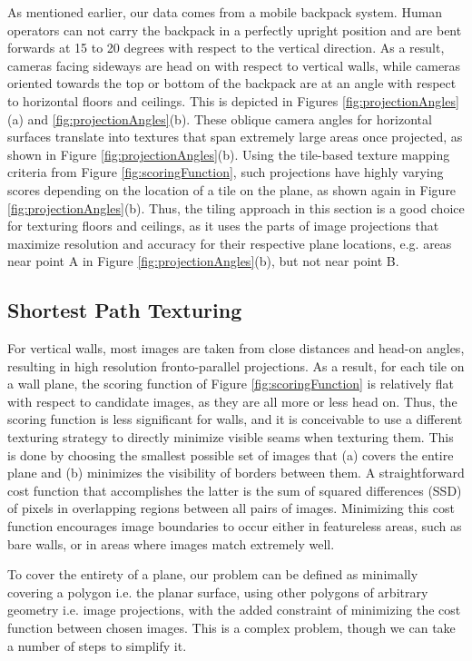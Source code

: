 \documentclass[]{spie}  %
\begin{document}
As mentioned earlier, our data comes from a mobile backpack
system. Human operators can not carry the backpack in a perfectly
upright position and are bent forwards at 15 to 20 degrees with
respect to the vertical direction. As a result, cameras facing
sideways are head on with respect to vertical walls, while cameras
oriented towards the top or bottom of the backpack are at an angle
with respect to horizontal floors and ceilings. This is depicted in
Figures \ref{fig:projectionAngles}(a) and
\ref{fig:projectionAngles}(b). These oblique camera angles for
horizontal surfaces translate into textures that span extremely large
areas once projected, as shown in Figure
\ref{fig:projectionAngles}(b). Using the tile-based texture mapping
criteria from Figure \ref{fig:scoringFunction}, such projections have
highly varying scores depending on the location of a tile on the
plane, as shown again in Figure \ref{fig:projectionAngles}(b). Thus,
the tiling approach in this section is a
good choice for texturing floors and ceilings, as it uses the parts of
image projections that maximize resolution and accuracy for their
respective plane locations, e.g. areas near point A in Figure
\ref{fig:projectionAngles}(b), but not near point B.


\subsection{Shortest Path Texturing}

For vertical walls, most images are taken from close distances and
head-on angles, resulting in high resolution fronto-parallel
projections. As a result, for each tile on a wall plane, the scoring
function of Figure \ref{fig:scoringFunction} is relatively flat with
respect to candidate images, as they are all more or less head
on. Thus, the scoring function is less significant for walls, and it
is conceivable to use a different texturing strategy to directly
minimize visible seams when texturing them. This is done by choosing
the smallest possible set of images that (a) covers the entire plane
and (b) minimizes the visibility of borders between them. A
straightforward cost function that accomplishes the latter is the sum
of squared differences (SSD) of pixels in overlapping regions between
all pairs of images. Minimizing this cost function encourages image
boundaries to occur either in featureless areas, such as bare walls,
or in areas where images match extremely well.

To cover the entirety of a plane, our problem can be defined as
minimally covering a polygon i.e. the planar surface, using other
polygons of arbitrary geometry i.e. image projections, with the added
constraint of minimizing the cost function between chosen images.
This is a complex problem, though we can take a number of steps to
simplify it.
\end{document}
